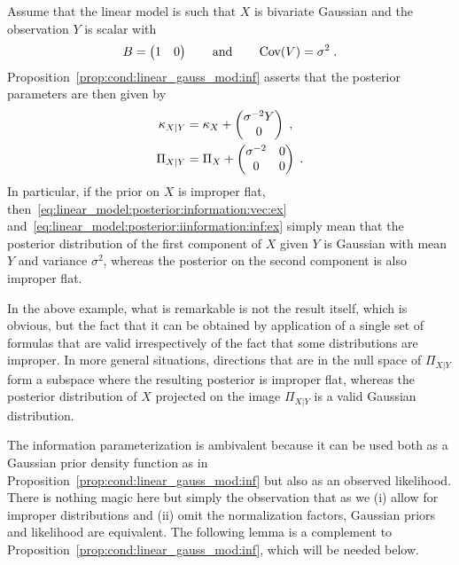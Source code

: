 \begin{ex}
  Assume that the linear model is such that $X$ is bivariate Gaussian and the
  observation $Y$ is scalar with
\[
B = \begin{pmatrix}
  1 & 0
\end{pmatrix} \qquad \text{and} \qquad \operatorname{Cov}(V) = \sigma^2 \; .
\]
Proposition~\ref{prop:cond:linear_gauss_mod:inf} asserts that the posterior
parameters are then given by
\begin{align}
    \label{eq:linear_model:posterior:information:vec:ex}
    \kappa_{X|Y} & = \kappa_X + \begin{pmatrix}
  \sigma^{-2} Y\\ 0
  \end{pmatrix} \; , \\
    \label{eq:linear_model:posterior:iinformation:inf:ex}
    \Pi_{X|Y} & = \Pi_{X} +  \begin{pmatrix}
  \sigma^{-2}& 0 \\ 0 & 0
  \end{pmatrix} \; .
\end{align}
In particular, if the prior on $X$ is improper flat,
then~\eqref{eq:linear_model:posterior:information:vec:ex}
and~\eqref{eq:linear_model:posterior:iinformation:inf:ex} simply mean that the
posterior distribution of the first component of $X$ given $Y$ is Gaussian with
mean $Y$ and variance $\sigma^2$, whereas the posterior on the second component
is also improper flat.
\end{ex}

In the above example, what is remarkable is not the result itself, which is
obvious, but the fact that it can be obtained by application of a single set of
formulas that are valid irrespectively of the fact that some distributions are
improper. In more general situations, directions that are in the null space of
$\Pi_{X|Y}$ form a subspace where the resulting posterior is improper flat,
whereas the posterior distribution of $X$ projected on the image $\Pi_{X|Y}$
is a valid Gaussian distribution.

The information parameterization is ambivalent because it can be used both as a
Gaussian prior density function as in
Proposition~\ref{prop:cond:linear_gauss_mod:inf} but also as an observed
likelihood. There is nothing magic here but simply the observation that as
we (i) allow for improper distributions and (ii) omit the normalization factors,
Gaussian priors and likelihood are equivalent. The following lemma is a
complement to Proposition~\ref{prop:cond:linear_gauss_mod:inf}, which will be
needed below.

